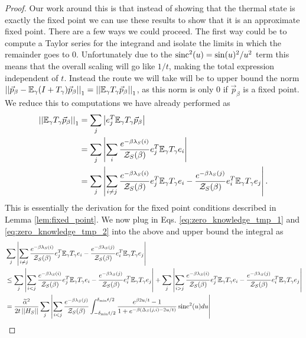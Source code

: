 \begin{proof}
    Our work around this is that instead of showing that the thermal state is exactly the fixed point we can use these results to show that it is an approximate fixed point. There are a few ways we could proceed. The first way could be to compute a Taylor series for the integrand and isolate the limits in which the remainder goes to 0. Unfortunately due to the $\operatorname{sinc}^2(u) = \sin(u)^2 / u^2$ term this means that the overall scaling will go like $1/t$, making the total expression independent of $t$. Instead the route we will take will be to upper bound the norm $\left| \left| \vec{p}_{\beta} - \mathbb{E}_\gamma (I + T_\gamma)\vec{p}_\beta \right| \right|_1 = \left| \left| \mathbb{E}_\gamma T_\gamma \vec{p}_\beta \right| \right|_1$, as this norm is only 0 if $\vec{p}_\beta$ is a fixed point. We reduce this to computations we have already performed as
    \begin{align}
        \left| \left| \mathbb{E}_\gamma T_\gamma \vec{p}_\beta \right| \right|_1 &= \sum_j \left| e_j^T \mathbb{E}_\gamma T_\gamma \vec{p}_\beta  \right| \\
        &= \sum_j \left| \sum_{i} \frac{e^{-\beta \lambda_S(i)}}{\mathcal{Z}_S(\beta)} e_j^T \mathbb{E}_\gamma T_\gamma e_i  \right| \\
        &= \sum_j \left| \sum_{i \neq j} \frac{e^{-\beta \lambda_S(i)}}{\mathcal{Z}_S(\beta)} e_j^T \mathbb{E}_\gamma T_\gamma e_i - \frac{e^{-\beta \lambda_S(j)}}{\mathcal{Z}_S(\beta)} e_i^T \mathbb{E}_\gamma T_\gamma e_j \right|.
    \end{align}
    This is essentially the derivation for the fixed point conditions described in Lemma \ref{lem:fixed_point}. We now plug in Eqs. \eqref{eq:zero_knowledge_tmp_1} and \eqref{eq:zero_knowledge_tmp_2} into the above and upper bound the integral as
    \begin{align}
        &\sum_j \abs{\sum_{i \neq j} \frac{e^{-\beta \lambda_S(i)}}{\partfun_S(\beta)} e_j^T \EE_\gamma T_\gamma e_i - \frac{e^{-\beta \lambda_S(j)}}{\partfun_S(\beta)} e_i^T \EE_\gamma T_\gamma e_j} \nonumber \\
        &\le \sum_j \abs{\sum_{i < j} \frac{e^{-\beta \lambda_S(i)}}{\partfun_S(\beta)} e_j^T \EE_\gamma T_\gamma e_i - \frac{e^{-\beta \lambda_S(j)}}{\partfun_S(\beta)} e_i^T \EE_\gamma T_\gamma e_j} + \sum_j  \abs{\sum_{i > j} \frac{e^{-\beta \lambda_S(i)}}{\partfun_S(\beta)} e_j^T \EE_\gamma T_\gamma e_i - \frac{e^{-\beta \lambda_S(j)}}{\partfun_S(\beta)} e_i^T \EE_\gamma T_\gamma e_j} \\
        &= \frac{\widetilde{\alpha}^2}{2 t \norm{H_S}} \sum_j \abs{\sum_{i < j} \frac{e^{-\beta \lambda_S(j)}}{\partfun_S(\beta)} \int_{-\delta_{\min} t /2 }^{\delta_{\min} t/ 2} \frac{ e^{\beta 2 u / t} - 1}{1 + e^{-\beta(\Delta_S(j, i) - 2u/t)}} \sinc^2(u) du} \nonumber \\

\end{align}
\end{proof}
